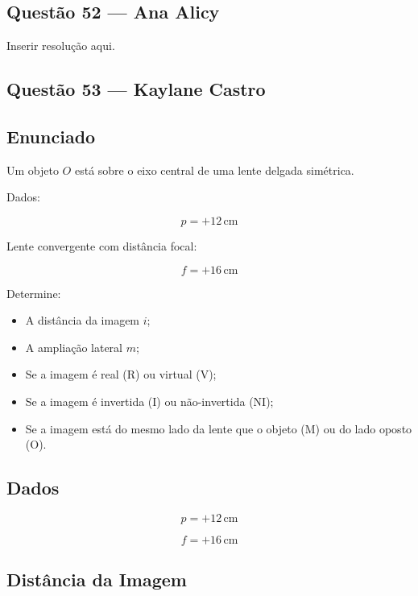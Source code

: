 \documentclass[12pt,a4paper]{article}
\begin{document}
\subsection{Questão 52 — Ana Alicy}
Inserir resolução aqui.

\subsection{Questão 53 — Kaylane Castro}


\subsection*{Enunciado}

Um objeto $O$ está sobre o eixo central de uma lente delgada simétrica.

Dados:

\[
p = +12\,\text{cm}
\]

Lente convergente com distância focal:

\[
f = +16\,\text{cm}
\]

Determine:

\begin{itemize}
    \item[\textbf{(a)}] A distância da imagem $i$;
    \item[\textbf{(b)}] A ampliação lateral $m$;
    \item[\textbf{(c)}] Se a imagem é real (R) ou virtual (V);
    \item[\textbf{(d)}] Se a imagem é invertida (I) ou não-invertida (NI);
    \item[\textbf{(e)}] Se a imagem está do mesmo lado da lente que o objeto (M) ou do lado oposto (O).
\end{itemize}


\subsection*{Dados}

\[
p = +12\,\text{cm}
\]

\[
f = +16\,\text{cm}
\]


\subsection*{Distância da Imagem}
\end{document}
